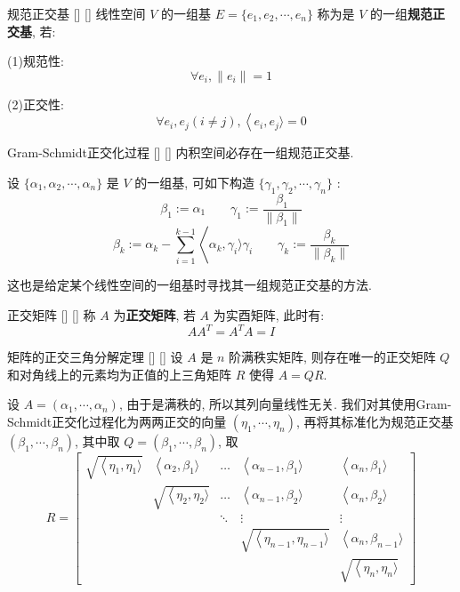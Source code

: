 \documentclass[UTF8]{ctexart}
\DeclareMathOperator{\0}{\mathbf{0}}
\DeclareMathOperator{\<}{\langle}
\renewcommand{\>}{\rangle}
\begin{document}
		\begin{dfn}
			[]
			{规范正交基}
			[]
			[]
			线性空间 \(V\) 的一组基 \(E=\{e_1,e_2,\cdots,e_n\}\) 称为是 \(V\) 的一组\textbf{规范正交基}, 若: 

			(1)规范性: 
			\[\forall e_i, \|e_i\|=1\]

			(2)正交性: 
			\[\forall e_i,e_j(i\neq j), \<e_i,e_j\>=0\]
		\end{dfn}
		
		\begin{thm}
			[]
			{Gram-Schmidt正交化过程}
			[]
			[]
			内积空间必存在一组规范正交基. 
		\end{thm}
		
		\begin{prf}
			设 \(\{\alpha_1,\alpha_2,\cdots,\alpha_n\}\) 是 \(V\) 的一组基, 可如下构造 \(\{\gamma_1,\gamma_2,\cdots,\gamma_n\}\) : 
			\[\beta_1:=\alpha_1\qquad\gamma_1:=\frac{\beta_1}{\|\beta_1\|}\]
			\[\beta_k:=\alpha_k-\sum_{i=1}^{k-1}\<\alpha_k,\gamma_i\>\gamma_i\qquad\gamma_k:=\frac{\beta_k}{\|\beta_k\|}\]
		\end{prf}
		
		这也是给定某个线性空间的一组基时寻找其一组规范正交基的方法. 

		\begin{dfn}
			[]
			{正交矩阵}
			[]
			[]
			称 \(A\) 为\textbf{正交矩阵}, 若 \(A\) 为实酉矩阵, 此时有: \[AA^T=A^T A=I\]
		\end{dfn}

		\begin{thm}
			[]
			{矩阵的正交三角分解定理}
			[]
			[]
			设 \(A\) 是 \(n\) 阶满秩实矩阵, 则存在唯一的正交矩阵 \(Q\) 和对角线上的元素均为正值的上三角矩阵 \(R\) 使得 \(A=QR\).
		\end{thm}

		\begin{prf}
			设 \(A=(\alpha_1,\cdots,\alpha_n)\), 由于是满秩的, 所以其列向量线性无关. 我们对其使用Gram-Schmidt正交化过程化为两两正交的向量 \((\eta_1,\cdots,\eta_n)\), 再将其标准化为规范正交基 \((\beta_1,\cdots,\beta_n)\), 其中取 \(Q=(\beta_1,\cdots,\beta_n)\), 取
			\[R=\begin{bmatrix}
				\sqrt{\<\eta_1,\eta_1\>}&\<\alpha_2,\beta_1\>&\ldots&\<\alpha_{n-1},\beta_1\>&\<\alpha_n,\beta_1\>\\
				&\sqrt{\<\eta_2,\eta_2\>}&\ldots&\<\alpha_{n-1},\beta_2\>&\<\alpha_n,\beta_2\>\\
				&&\ddots&\vdots&\vdots\\
				&&&\sqrt{\<\eta_{n-1},\eta_{n-1}\>}&\<\alpha_n,\beta_{n-1}\>\\
				&&&&\sqrt{\<\eta_{n},\eta_{n}\>} 
			\end{bmatrix}
			\]
		\end{prf}
\end{document}

